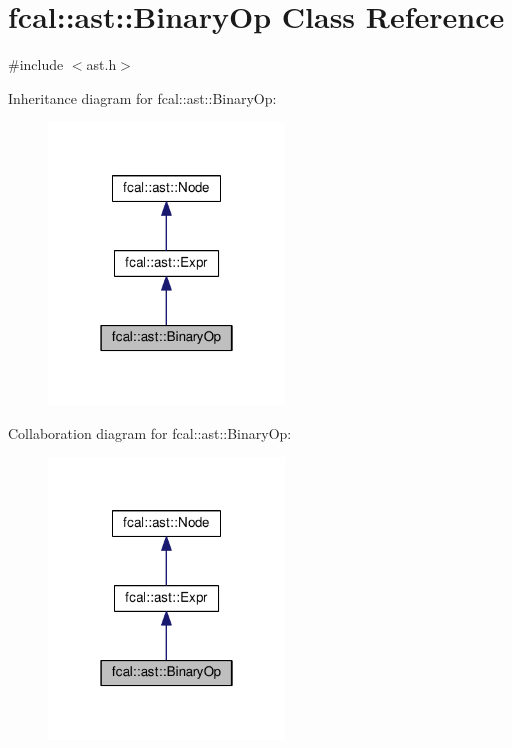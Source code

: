 \hypertarget{classfcal_1_1ast_1_1BinaryOp}{}\section{fcal\+:\+:ast\+:\+:Binary\+Op Class Reference}
\label{classfcal_1_1ast_1_1BinaryOp}


{\ttfamily \#include $<$ast.\+h$>$}



Inheritance diagram for fcal\+:\+:ast\+:\+:Binary\+Op\+:\nopagebreak
\begin{figure}[H]
\begin{center}
\leavevmode
\includegraphics[width=178pt]{classfcal_1_1ast_1_1BinaryOp__inherit__graph}
\end{center}
\end{figure}


Collaboration diagram for fcal\+:\+:ast\+:\+:Binary\+Op\+:\nopagebreak
\begin{figure}[H]
\begin{center}
\leavevmode
\includegraphics[width=178pt]{classfcal_1_1ast_1_1BinaryOp__coll__graph}
\end{center}
\end{figure}
